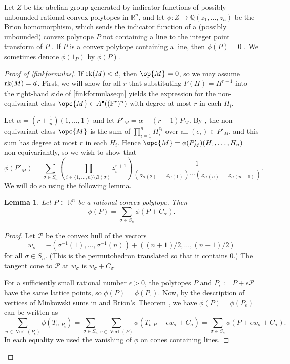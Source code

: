 \documentclass[12pt]{amsart}
\newcommand{\mb}{\mathbb}
\newcommand{\mc}{\mathcal}
\newcommand{\rk}{{\rm rk}}
\newcommand{\Vt}{{\operatorname{Vert}}}
\theoremstyle{plain}
\newtheorem{Lem}[Thm]{Lemma}
\theoremstyle{definition}
\theoremstyle{remark}
\begin{document}
Let $Z$ be the abelian group generated by indicator functions of possibly unbounded rational convex polytopes in $\mb{R}^n$, and let $\phi : Z \to \mb{Q}(z_1, \ldots, z_n)$ be the Brion homomorphism, which sends the indicator function of a (possibly unbounded) convex polytope $P$ not containing a line to the integer point transform of $P$ \cite[Theorem 2.4]{BHS}. If $P$ is a convex polytope containing a line, then $\phi(P) = 0$ \cite[Lemma 2.5]{BHS}. We sometimes denote $\phi(1_P)$ by $\phi(P)$.

\begin{proof}[Proof of \cref{finkformulas}]
If $\rk(M) < d$, then $\op{M} = 0$, so we may assume $\rk(M) = d$. First, we will show for all $r$ that substituting $F(H) = H^{r+1}$ into the right-hand side of \eqref{finkformulaseqn} yields the expression for the non-equivariant class $\opc{M} \in A^\bullet((\mb{P}^r)^n)$ with degree at most $r$ in each $H_i$.

Let $\alpha = (r+\frac{1}{n})(1,\ldots,1)$ and let $P'_M = \alpha -(r+1)P_M$. By , the non-equivariant class $\opc{M}$ is the sum of $\prod_{i=1}^n H_i^{e_i}$ over all $(e_i)\in P'_M$, and this sum has degree at most $r$ in each $H_i$. Hence
$\opc{M} = \phi(P'_M) (H_1,\ldots, H_n)$ non-equivariantly, so we wish to show that 
\begin{equation}\label{noneqformula}
\phi(P'_M) = \sum_{\sigma \in S_n} \left(\prod_{i \in \{1,\ldots,n\}\setminus B(\sigma)} z_i^{r+1}\right)\frac{1}{(z_{\sigma(2)}-z_{\sigma(1)})\cdots (z_{\sigma(n)}-z_{\sigma(n-1)})}.
\end{equation}
We will do so using the following lemma.

\begin{Lem}\label{addallcones}
Let $P \subset \mb{R}^n$ be a rational convex polytope. Then \[\phi(P) = \sum_{\sigma \in S_n} \phi(P + C_\sigma).\]
\end{Lem}
\begin{proof}
Let $\mc{P}$ be the convex hull of the vectors \[w_\sigma = -(\sigma^{-1}(1), \ldots, \sigma^{-1}(n)) + ((n+1)/2, \ldots, (n+1)/2)\] for all $\sigma \in S_n$. (This is the permutohedron \cite[Example 2.6]{permutahedron} translated so that it contains $0$.) The tangent cone to $\mc{P}$ at $w_\sigma$ is $w_\sigma + C_\sigma$.

For a sufficiently small rational number $\epsilon > 0$, the polytopes $P$ and $P_\epsilon := P + \epsilon \mc{P}$ have the same lattice points, so $\phi(P) = \phi(P_\epsilon)$. Now, by the description of vertices of Minkowski sums in  and Brion's~Theorem \cite[p.3]{BHS}, we have $\phi(P) = \phi(P_\epsilon)$ can be written as
\[
  \sum_{u \in \Vt(P_\epsilon)} \phi(T_{u, P_\epsilon}) 
= \sum_{\sigma \in S_n} \sum_{v \in \Vt(P)}  \phi(T_{v, P} + \epsilon w_\sigma + C_\sigma) 
= \sum_{\sigma \in S_n} \phi(P + \epsilon w_\sigma + C_\sigma).\]
In each equality we used the vanishing of $\phi$ on cones containing lines.


\end{proof}
\end{proof}
\end{document}
